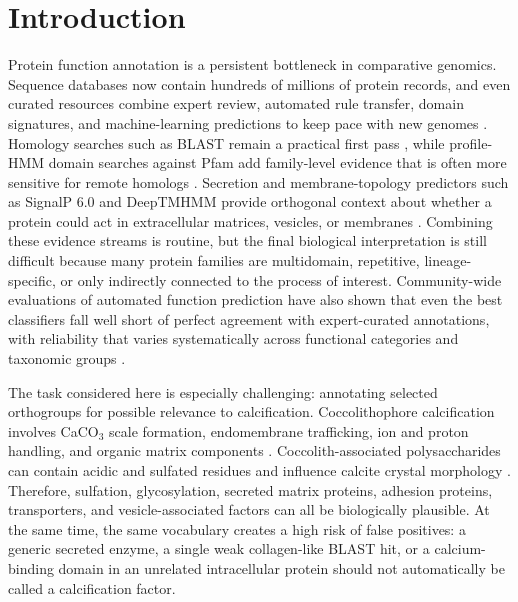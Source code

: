 \documentclass[11pt]{article}
\begin{document}
\doublespacing

\section{Introduction}

Protein function annotation is a persistent bottleneck in comparative genomics. Sequence databases now contain hundreds of millions of protein records, and even curated resources combine expert review, automated rule transfer, domain signatures, and machine-learning predictions to keep pace with new genomes \citep{UniProt2025}. Homology searches such as BLAST remain a practical first pass \citep{Altschul1990}, while profile-HMM domain searches against Pfam add family-level evidence that is often more sensitive for remote homologs \citep{Mistry2021,Eddy2011}. Secretion and membrane-topology predictors such as SignalP 6.0 and DeepTMHMM provide orthogonal context about whether a protein could act in extracellular matrices, vesicles, or membranes \citep{Teufel2022,Hallgren2022}. Combining these evidence streams is routine, but the final biological interpretation is still difficult because many protein families are multidomain, repetitive, lineage-specific, or only indirectly connected to the process of interest. Community-wide evaluations of automated function prediction have also shown that even the best classifiers fall well short of perfect agreement with expert-curated annotations, with reliability that varies systematically across functional categories and taxonomic groups \citep{Radivojac2013}.

The task considered here is especially challenging: annotating selected orthogroups for possible relevance to calcification. Coccolithophore calcification involves CaCO$_3$ scale formation, endomembrane trafficking, ion and proton handling, and organic matrix components \citep{Brownlee2015,Skeffington2023}. Coccolith-associated polysaccharides can contain acidic and sulfated residues and influence calcite crystal morphology \citep{Kayano2011}. Therefore, sulfation, glycosylation, secreted matrix proteins, adhesion proteins, transporters, and vesicle-associated factors can all be biologically plausible. At the same time, the same vocabulary creates a high risk of false positives: a generic secreted enzyme, a single weak collagen-like BLAST hit, or a calcium-binding domain in an unrelated intracellular protein should not automatically be called a calcification factor.
\end{document}
